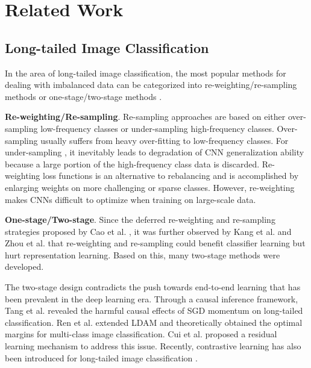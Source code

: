 \documentclass[final]{cvpr}
\begin{document}
\section{Related Work}
\subsection{Long-tailed Image Classification}
In the area of long-tailed image classification, the most popular methods for dealing with imbalanced data can be categorized into re-weighting/re-sampling methods \cite{shen2016relay, zhong2016towards, buda2018systematic, byrd2019effect, he2009learning, japkowicz2002class, DBLP:journals/nn/BudaMM18, DBLP:conf/cvpr/HuangLLT16,huang2019deep,wang2017learning, ren2018learning, shu2019meta, jamal2020rethinking} or one-stage/two-stage methods \cite{cao2019learning, kang2019decoupling, Zhong_2021_CVPR, zhou2019bbn,cui2021parametric,DBLP:journals/corr/abs-2101-10633}.

\vspace{1mm}
\noindent\textbf{Re-weighting/Re-sampling}.
Re-sampling approaches are based on either over-sampling low-frequency classes or under-sampling high-frequency classes. Over-sampling \cite{shen2016relay, zhong2016towards, buda2018systematic, byrd2019effect} usually suffers from heavy over-fitting to low-frequency classes. For under-sampling \cite{he2009learning, japkowicz2002class, DBLP:journals/nn/BudaMM18}, it inevitably leads to degradation of CNN generalization ability because a large portion of the high-frequency class data is discarded.
Re-weighting \cite{DBLP:conf/cvpr/HuangLLT16,huang2019deep,wang2017learning, ren2018learning, shu2019meta, jamal2020rethinking} loss functions is an alternative to rebalancing and is accomplished by enlarging weights
on more challenging or sparse classes. However, re-weighting makes CNNs difficult to optimize when training on large-scale data.


\vspace{1mm}
\noindent\textbf{One-stage/Two-stage}.
Since the deferred re-weighting and re-sampling strategies proposed by Cao et al. \cite{cao2019learning}, it was further observed by Kang et al. \cite{kang2019decoupling} and Zhou et al. \cite{zhou2019bbn} that re-weighting and re-sampling could benefit classifier learning but hurt representation learning. Based on this, many two-stage methods \cite{cao2019learning, kang2019decoupling, Zhong_2021_CVPR} were developed. 


The two-stage design contradicts the push towards end-to-end learning that has been prevalent in the deep learning era. Through a causal inference framework, Tang et al. \cite{tang2020long} revealed the harmful causal effects of SGD momentum on long-tailed classification. Ren et al. \cite{DBLP:conf/nips/RenYSMZYL20} extended LDAM \cite{cao2019learning} and theoretically obtained the optimal margins for multi-class image classification. Cui et al. \cite{DBLP:conf/cvpr/CuiJLSB19} proposed a residual learning mechanism to address this issue. Recently, contrastive learning has also been introduced for long-tailed image classification \cite{cui2021parametric}.
\end{document}
